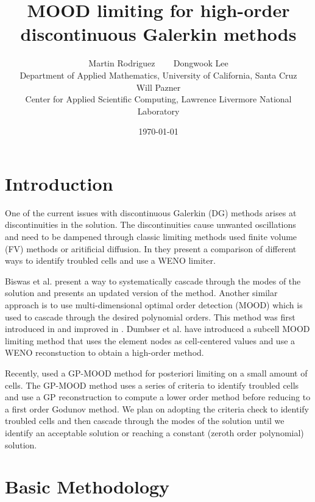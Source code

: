 \documentclass[11pt]{article}
\title{MOOD limiting for high-order discontinuous Galerkin methods}
\date{\today}
\author{Martin Rodriguez ~~~ Dongwook Lee \\ {\small Department of Applied Mathematics,  University of California, Santa Cruz} \\[11pt] Will Pazner \\ {\small Center for Applied Scientific Computing, Lawrence Livermore National Laboratory} }
\begin{document}
\maketitle

\onehalfspacing

\section{Introduction}


One of the current issues with discontinuous Galerkin (DG) methods arises at discontinuities in the solution. The discontinuities cause unwanted oscillations and need to be dampened through classic limiting methods used finite volume (FV) methods or aritificial diffusion. In \cite{qiu2005comparison} they present a comparison of different ways to identify troubled cells and use a WENO limiter.

Biswas et al. \cite{biswas1994parallel} present a way to systematically cascade through the modes of the solution and \cite{krivodonova2007limiters} presents an updated version of the method. Another similar approach is to use multi-dimensional optimal order detection (MOOD) which is used to cascade through the desired polynomial orders. This method was first introduced in \cite{clainavery} and improved in \cite{diot2012improved}. Dumbser et al. \cite{dumbser2014posteriori} have introduced a subcell MOOD limiting method that uses the element nodes as cell-centered values and use a WENO reconstuction to obtain a high-order method.  

Recently, \cite{bourgeois2021gp} used a GP-MOOD method for posteriori limiting on a small amount of cells. The GP-MOOD method uses a series of criteria to identify troubled cells and use a GP reconstruction to compute a lower order method before reducing to a first order Godunov method. We plan on adopting the criteria check to identify troubled cells and then cascade through the modes of the solution until we identify an acceptable solution or reaching a constant (zeroth order polynomial) solution. 

\section{Basic Methodology}
\end{document}
